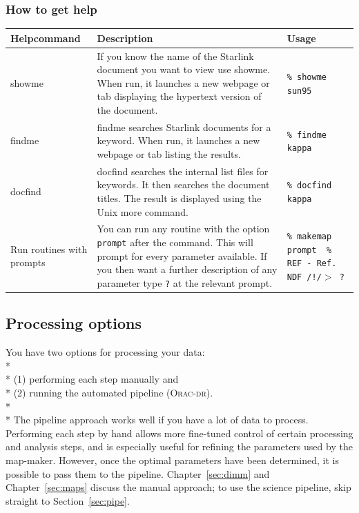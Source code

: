 \documentclass[twoside,11pt]{article}
\newcommand{\htmlref}[2]{#1}
\newcommand{\latexhtml}[2]{#1}
\newcommand{\xlabel}[1]{}
\renewcommand{\_}{\texttt{\symbol{95}}}
\newcommand{\task}[1]{\textsf{#1}}
\newcommand{\cref}[3]{\latexhtml{#1~\ref{#2}}{\htmlref{#3}{#2}}}
\begin{document}
\subsubsection{\xlabel{help}How to get help}
\label{sec:help}
\begin{table}[h!]
\begin{tabular}{p{2.3cm}|p{7.3cm}|p{5cm}}
\textbf{Help\newline command} & \textbf{Description} & \textbf{Usage}\\
\hline
\task{showme} & If you know the name of the Starlink document you want to view
                use \task{showme}. When run, it launches a new webpage or tab
                displaying the hypertext version of the document. &
                \texttt{\% showme sun95}\\
\hline
\task{findme} & \task{findme} searches Starlink documents for a keyword. When
                run, it launches a new webpage or tab listing the results. &
                \texttt{\% findme kappa}\\
\hline
\task{docfind} & \task{docfind} searches the internal list files for keywords. It then
                 searches the document titles. The result is displayed using the
                 Unix \task{more} command. & \texttt{\% docfind kappa}\\
\hline
Run routines with prompts & You can run any routine with the option
                            \texttt{prompt} after the command. This will
                            prompt for every parameter available. If you
                            then want a further description of any parameter
                            type  \texttt{?} at the relevant prompt. &
                            \texttt{\% makemap prompt \newline\ \% REF - Ref. NDF /!/$>$ ?}\\
\hline
\end{tabular}
\end{table}

\subsection{\xlabel{options}Processing options}

You have two options for processing your data:
\\*\\*
(1) performing each step manually and\\*
(2) running the automated pipeline (\textsc{Orac-dr}).
\\*\\*
The pipeline approach works well if you have a lot of data to process.
Performing each step by hand allows more fine-tuned control of certain
processing and analysis steps, and is especially useful for refining
the parameters used by the map-maker. However, once the optimal
parameters have been determined, it is possible to pass them to the
pipeline. \cref{Chapter}{sec:dimm}{The Dynamic Iterative Map-maker Explained}
and \cref{Chapter}{sec:maps}{Reducing Your Data} discuss the manual approach;
to use the science pipeline, skip
straight to \cref{Section}{sec:pipe}{The SCUBA-2 Pipeline}.
\end{document}
